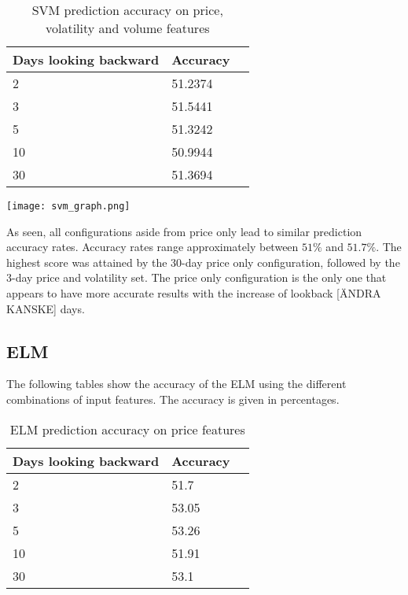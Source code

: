 \documentclass{article}
\begin{document}
\begin{table}[!h]
\begin{center}
    \begin{tabular}{ | l | l | p{3cm} |}
    \hline
    Days looking backward & Accuracy \\ \hline
    2 & 51.2374  \\ \hline
    3 & 51.5441  \\ \hline
    5 & 51.3242  \\ \hline
    10 & 50.9944  \\ \hline
    30 & 51.3694 \\ 
    \hline
    \end{tabular}
\caption{SVM prediction accuracy on price, volatility and volume features}
\end{center}
\end{table}

\texttt{[image: svm\_graph.png]}

As seen, all configurations aside from price only lead to similar prediction accuracy rates. Accuracy rates range approximately between $51\%$ and  $51.7\%$. The highest score was attained by the 30-day price only configuration, followed by the 3-day price and volatility set. The price only configuration is the only one that appears to have more accurate results with the increase of lookback [ÄNDRA KANSKE] days.
\newpage
\subsection{ELM}
The following tables show the accuracy of the ELM using the different combinations of input features. The accuracy is given in percentages.
\\
\begin{table}[!h]
\begin{center}
    \begin{tabular}{ | l | l | p{3cm} |}
    \hline
    Days looking backward & Accuracy \\ \hline
    2 &  51.7 \\ \hline
    3 & 53.05  \\ \hline
    5 & 53.26  \\ \hline
    10 & 51.91  \\ \hline
    30 & 53.1 \\ 
    \hline
    \end{tabular}
\caption{ELM prediction accuracy on price features}
\end{center}
\end{table}
\end{document}
